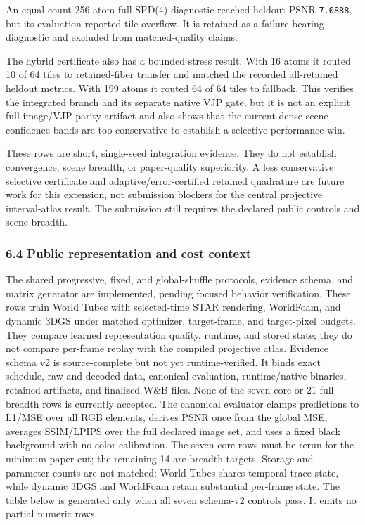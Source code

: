 \documentclass[
]{article}
\begin{document}
An equal-count 256-atom full-SPD(4) diagnostic reached heldout PSNR
\texttt{7.0888}, but its evaluation reported tile overflow. It is
retained as a failure-bearing diagnostic and excluded from
matched-quality claims.

The hybrid certificate also has a bounded stress result. With 16 atoms
it routed 10 of 64 tiles to retained-fiber transfer and matched the
recorded all-retained heldout metrics. With 199 atoms it routed 64 of 64
tiles to fallback. This verifies the integrated branch and its separate
native VJP gate, but it is not an explicit full-image/VJP parity
artifact and also shows that the current dense-scene confidence bands
are too conservative to establish a selective-performance win.

These rows are short, single-seed integration evidence. They do not
establish convergence, scene breadth, or paper-quality superiority. A
less conservative selective certificate and adaptive/error-certified
retained quadrature are future work for this extension, not submission
blockers for the central projective interval-atlas result. The
submission still requires the declared public controls and scene
breadth.

\subsubsection{6.4 Public representation and cost
context}\label{public-representation-and-cost-context}

The shared progressive, fixed, and global-shuffle protocols, evidence
schema, and matrix generator are implemented, pending focused behavior
verification. These rows train World Tubes with selected-time STAR
rendering, WorldFoam, and dynamic 3DGS under matched optimizer,
target-frame, and target-pixel budgets. They compare learned
representation quality, runtime, and stored state; they do not compare
per-frame replay with the compiled projective atlas. Evidence schema v2
is source-complete but not yet runtime-verified. It binds exact
schedule, raw and decoded data, canonical evaluation, runtime/native
binaries, retained artifacts, and finalized W\&B files. None of the
seven core or 21 full-breadth rows is currently accepted. The canonical
evaluator clamps predictions to L1/MSE over all RGB elements, derives
PSNR once from the global MSE, averages SSIM/LPIPS over the full
declared image set, and uses a fixed black background with no color
calibration. The seven core rows must be rerun for the minimum paper
cut; the remaining 14 are breadth targets. Storage and parameter counts
are not matched: World Tubes shares temporal trace state, while dynamic
3DGS and WorldFoam retain substantial per-frame state. The table below
is generated only when all seven schema-v2 controls pass. It emits no
partial numeric rows.
\end{document}
